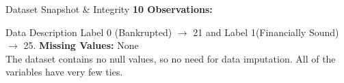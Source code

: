 \documentclass[8pt, aspectratio=169]{beamer}
\begin{document}
\begin{frame}{Dataset Snapshot \& Integrity}
    \textbf{10 Observations:}
    \vspace{0.2cm}
    
    \begin{table}
        \centering
    \end{table}

    \vspace{0.4cm}
    \begin{block}{Data Description}
        \centering
        Label 0 (Bankrupted) $\longrightarrow$ 21 and Label 1(Financially Sound) $\longrightarrow$ 25. 
        \textbf{Missing Values:} None \\
        The dataset contains no null values, so no need for data imputation. All of the variables have very few ties.
    \end{block}
\end{frame}
\end{document}
